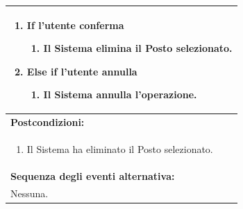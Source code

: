 \documentclass{article}
\begin{document}
\begin{table}[H]
\begin{tabular}{|p{\linewidth}|}
\begin{enumerate}
                            \item \textbf{If} l'utente conferma
                            \begin{enumerate}
                                \item Il Sistema elimina il Posto selezionato.
                            \end{enumerate}
                            \item \textbf{Else if} l'utente annulla
                            \begin{enumerate}
                                \item Il Sistema annulla l'operazione.
                            \end{enumerate}
                        \end{enumerate} \\
                        \hline
                        \cellcolor{gray!20}
                        \textbf{Postcondizioni:} \\
                        \cellcolor{gray!20}
                        \begin{minipage}{\linewidth}
                            \begin{enumerate}
                                \item Il Sistema ha eliminato il Posto selezionato.
                            \end{enumerate}
                        \end{minipage} \\
                        \hline
                        \textbf{Sequenza degli eventi alternativa:} \\
                        Nessuna. \\
                        \hline
                    \end{tabular}
                \end{table}
                
\end{document}
